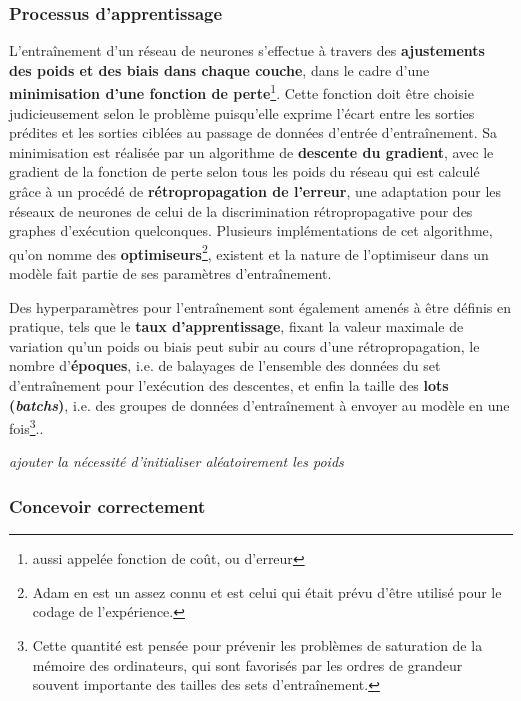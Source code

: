 \documentclass[12pt, french, twoside]{report}
\begin{document}
\subsubsection{Processus d'apprentissage}
L'entraînement d'un réseau de neurones s'effectue à travers des \textbf{ajustements des poids et des biais dans chaque couche}, dans le cadre d'une \textbf{minimisation d'une fonction de perte}\footnote{aussi appelée fonction de coût, ou d'erreur}. Cette fonction doit être choisie judicieusement selon le problème puisqu'elle exprime l'écart entre les sorties prédites et les sorties ciblées au passage de données d'entrée d'entraînement. Sa minimisation est réalisée par un algorithme de \textbf{descente du gradient}, avec le gradient de la fonction de perte selon tous les poids du réseau qui est calculé grâce à un procédé de \textbf{rétropropagation de l'erreur}, une adaptation pour les réseaux de neurones de celui de la discrimination rétropropagative pour des graphes d'exécution quelconques. Plusieurs implémentations de cet algorithme, qu'on nomme des \textbf{optimiseurs}\footnote{Adam\cite{kingma2017adam} en est un assez connu et est celui qui était prévu d'être utilisé pour le codage de l'expérience.}, existent et la nature de l'optimiseur dans un modèle fait partie de ses paramètres d'entraînement.

Des hyperparamètres pour l'entraînement sont également amenés à être définis en pratique, tels que le \textbf{taux d'apprentissage}, fixant la valeur maximale de variation qu'un poids ou biais peut subir au cours d'une rétropropagation, le nombre d'\textbf{époques}, i.e. de balayages de l'ensemble des données du set d'entraînement pour l'exécution des descentes, et enfin la taille des \textbf{lots (\textit{batchs})}, i.e. des groupes de données d'entraînement à envoyer au modèle en une fois\footnote{Cette quantité est pensée pour prévenir les problèmes de saturation de la mémoire des ordinateurs, qui sont favorisés par les ordres de grandeur souvent importante des tailles des sets d'entraînement.}.\cite[17-23]{jurafsky_ffnn}.\cite[21]{fourrier}

\textit{ajouter la nécessité d'initialiser aléatoirement les poids}

\subsubsection{Concevoir correctement}
\end{document}
